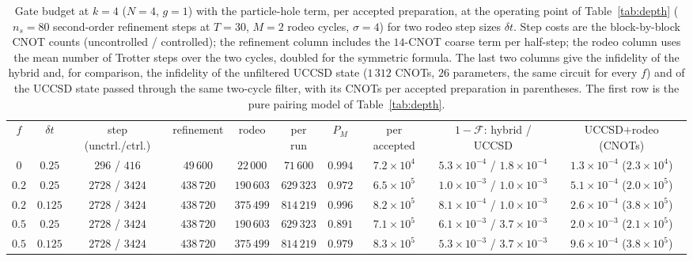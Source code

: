 \documentclass[
  aps,            %
  prc,            %
  reprint,        %
  superscriptaddress,
  floatfix,
  nofootinbib
]{revtex4-2}
\begin{document}
\begin{table}[t]
\caption{\label{tab:phdepth}Gate budget at $k=4$ ($N=4$, $g=1$) with the
particle-hole term, per accepted preparation, at the operating point of
Table~\ref{tab:depth} ($n_s=80$ second-order refinement steps at $T=30$, $M=2$
rodeo cycles, $\sigma=4$) for two rodeo step sizes $\delta t$.  Step costs are
the block-by-block CNOT counts (uncontrolled / controlled); the refinement
column includes the $14$-CNOT coarse term per half-step; the rodeo column uses
the mean number of Trotter steps over the two cycles, doubled for the symmetric
formula.  The last two columns give the infidelity of the hybrid and, for
comparison, the infidelity of the unfiltered UCCSD state ($1\,312$ CNOTs,
$26$ parameters, the same circuit for every $f$) and of the UCCSD state passed
through the same two-cycle filter, with its CNOTs per accepted preparation in
parentheses.  The first row is the pure pairing model of Table~\ref{tab:depth}.}
\footnotesize
\begin{ruledtabular}
\begin{tabular}{cccccccc cc}
$f$ & $\delta t$ & step (unctrl./ctrl.) & refinement & rodeo & per run & $P_M$ & per accepted & $1-\mathcal{F}$: hybrid / UCCSD & UCCSD$+$rodeo (CNOTs)\\
\colrule
$0$   & $0.25$  & $296$ / $416$   & $49\,600$  & $22\,000$ & $71\,600$ & $0.994$ & $7.2\times10^{4}$ & $5.3\times10^{-4}$ / $1.8\times10^{-4}$ & $1.3\times10^{-4}$ ($2.3\times10^{4}$)\\
$0.2$ & $0.25$  & $2728$ / $3424$ & $438\,720$ & $190\,603$ & $629\,323$ & $0.972$ & $6.5\times10^{5}$ & $1.0\times10^{-3}$ / $1.0\times10^{-3}$ & $5.1\times10^{-4}$ ($2.0\times10^{5}$)\\
$0.2$ & $0.125$ & $2728$ / $3424$ & $438\,720$ & $375\,499$ & $814\,219$ & $0.996$ & $8.2\times10^{5}$ & $8.1\times10^{-4}$ / $1.0\times10^{-3}$ & $2.6\times10^{-4}$ ($3.8\times10^{5}$)\\
$0.5$ & $0.25$  & $2728$ / $3424$ & $438\,720$ & $190\,603$ & $629\,323$ & $0.891$ & $7.1\times10^{5}$ & $6.1\times10^{-3}$ / $3.7\times10^{-3}$ & $2.0\times10^{-3}$ ($2.1\times10^{5}$)\\
$0.5$ & $0.125$ & $2728$ / $3424$ & $438\,720$ & $375\,499$ & $814\,219$ & $0.979$ & $8.3\times10^{5}$ & $5.3\times10^{-3}$ / $3.7\times10^{-3}$ & $9.6\times10^{-4}$ ($3.8\times10^{5}$)\\
\end{tabular}
\end{ruledtabular}
\end{table}
\end{document}
